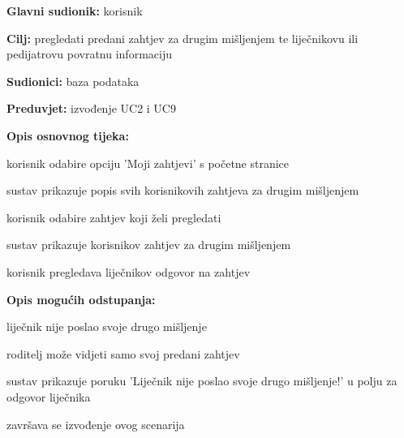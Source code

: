                     \noindent {}
					\begin{packed_item}
	
						\item \textbf{Glavni sudionik: }korisnik
						\item  \textbf{Cilj:} pregledati predani zahtjev za drugim mišljenjem te liječnikovu ili pedijatrovu povratnu informaciju 
						\item  \textbf{Sudionici:} baza podataka
						\item  \textbf{Preduvjet:} izvođenje UC2 i UC9
						\item  \textbf{Opis osnovnog tijeka:}
						
						\item[] \begin{packed_enum}
	
							\item korisnik odabire opciju 'Moji zahtjevi' s početne stranice
							\item sustav prikazuje popis svih korisnikovih zahtjeva za drugim mišljenjem
							\item korisnik odabire zahtjev koji želi pregledati
                            \item sustav prikazuje korisnikov zahtjev za drugim mišljenjem
                            \item korisnik pregledava liječnikov odgovor na zahtjev

						\end{packed_enum}
						
						\item  \textbf{Opis mogućih odstupanja:}
						
						\item[] \begin{packed_item}
	
							\item[5.a] liječnik nije poslao svoje drugo mišljenje
							\item[] \begin{packed_enum}
								\item roditelj može vidjeti samo svoj predani zahtjev
								\item sustav prikazuje poruku 'Liječnik nije poslao svoje drugo mišljenje!' u polju za odgovor liječnika
								\item završava se izvođenje ovog scenarija 
							\end{packed_enum}
							
						\end{packed_item}
					\end{packed_item}


